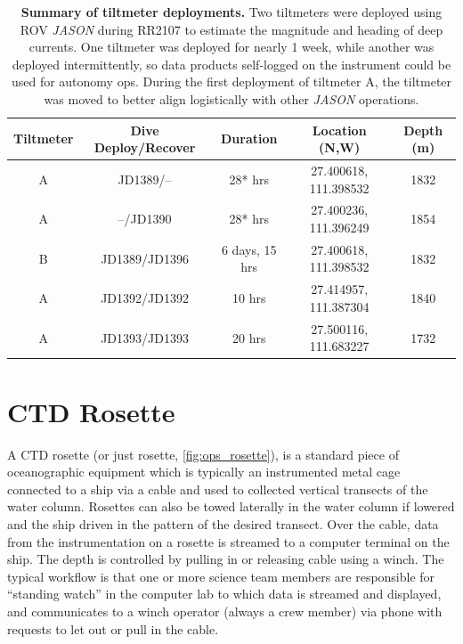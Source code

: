 \begin{table}[h!]
  \centering
  \begin{tabular}{c|c|c|c|c}
      Tiltmeter & Dive Deploy/Recover & Duration & Location (N,W) & Depth (m) \\
      \hline
      A & JD1389/-- & 28* hrs & 27.400618, 111.398532 & 1832 \\
      A & --/JD1390 & 28* hrs & 27.400236, 111.396249 & 1854 \\
      B & JD1389/JD1396 & 6 days, 15 hrs & 27.400618, 111.398532 & 1832 \\
      A & JD1392/JD1392 & 10 hrs & 27.414957, 111.387304 & 1840 \\
      A & JD1393/JD1393 & 20 hrs & 27.500116, 111.683227 & 1732 \\
  \end{tabular}
  \caption[Summary of tiltmeter deployments]{\textbf{Summary of tiltmeter deployments.} Two tiltmeters were deployed using ROV \emph{JASON} during RR2107 to estimate the magnitude and heading of deep currents. One tiltmeter was deployed for nearly 1 week, while another was deployed intermittently, so data products self-logged on the instrument could be used for autonomy ops. During the first deployment of tiltmeter A, the tiltmeter was moved to better align logistically with other \emph{JASON} operations.}
  \label{tab:ops_tilt}
\end{table}


\section{CTD Rosette}
A CTD rosette (or just rosette, \cref{fig:ops_rosette}), is a standard piece of oceanographic equipment which is typically an instrumented metal cage connected to a ship via a cable and used to collected vertical transects of the water column. Rosettes can also be towed laterally in the water column if lowered and the ship driven in the pattern of the desired transect. Over the cable, data from the instrumentation on a rosette is streamed to a computer terminal on the ship. The depth is controlled by pulling in or releasing cable using a winch. The typical workflow is that one or more science team members are responsible for ``standing watch'' in the computer lab to which data is streamed and displayed, and communicates to a winch operator (always a crew member) via phone with requests to let out or pull in the cable.

